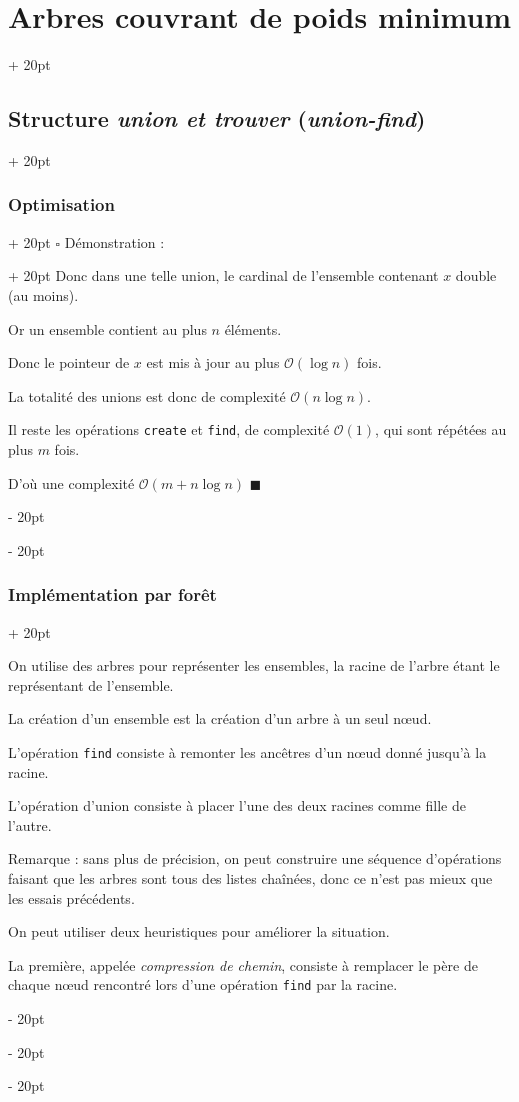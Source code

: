\documentclass[a4paper, 12pt, twoside]{article}
\newcommand{\ind}[1][20pt]{\advance\leftskip + #1}
\newcommand{\deind}[1][20pt]{\advance\leftskip - #1}
\newenvironment{indt}[2][20pt]{#2 \par \ind[#1]}{\par \deind} %
\newenvironment{proof}[1][{Démonstration :}]{\begin{indt}{$\square$ #1}}{$\blacksquare$ \end{indt}}
\begin{document}
\begin{indt}{\section{Arbres couvrant de poids minimum}}
\begin{indt}{\subsection{Structure \textit{union et trouver} (\textit{union-find})}}
\begin{indt}{\subsubsection{Optimisation}}
\begin{proof}
                    Donc dans une telle union, le cardinal de l'ensemble contenant $x$ double (au moins).

                    Or un ensemble contient au plus $n$ éléments.

                    Donc le pointeur de $x$ est mis à jour au plus $\mathcal O(\log n)$ fois.

                    La totalité des unions est donc de complexité $\mathcal O(n\log n)$.

                    Il reste les opérations \texttt{create} et \texttt{find}, de complexité $\mathcal O(1)$, qui sont répétées au plus $m$ fois.

                    D'où une complexité $\mathcal O(m + n\log n)$
                \end{proof}
            \end{indt}

            \vspace{12pt}
            
            \begin{indt}{\subsubsection{Implémentation par forêt}}
                \label{2.2.5}

                On utilise des arbres pour représenter les ensembles, la racine de l'arbre étant le représentant de l'ensemble.

                La création d'un ensemble est la création d'un arbre à un seul n\oe ud.

                L'opération \texttt{find} consiste à remonter les ancêtres d'un n\oe ud donné jusqu'à la racine.

                L'opération d'union consiste à placer l'une des deux racines comme fille de l'autre.

                Remarque : sans plus de précision, on peut construire une séquence d'opérations faisant que les arbres sont tous des listes chaînées, donc ce n'est pas mieux que les essais précédents.

                \vspace{12pt}
                
                On peut utiliser deux heuristiques pour améliorer la situation.

                La première, appelée \textit{compression de chemin}, consiste à remplacer le père de chaque n\oe ud rencontré lors d'une opération \texttt{find} par la racine.


\end{indt}
\end{indt}
\end{indt}
\end{document}
